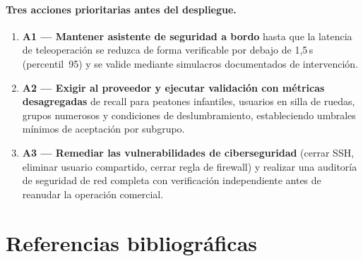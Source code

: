 \documentclass[11pt]{article}
\begin{document}
\paragraph{Tres acciones prioritarias antes del despliegue.}
\begin{enumerate}[nosep]
    \item \textbf{A1 --- Mantener asistente de seguridad a bordo} hasta que la latencia de teleoperación se reduzca de forma verificable por debajo de 1,5\,s (percentil~95) y se valide mediante simulacros documentados de intervención.
    \item \textbf{A2 --- Exigir al proveedor y ejecutar validación con métricas desagregadas} de recall para peatones infantiles, usuarios en silla de ruedas, grupos numerosos y condiciones de deslumbramiento, estableciendo umbrales mínimos de aceptación por subgrupo.
    \item \textbf{A3 --- Remediar las vulnerabilidades de ciberseguridad} (cerrar SSH, eliminar usuario compartido, cerrar regla de firewall) y realizar una auditoría de seguridad de red completa con verificación independiente antes de reanudar la operación comercial.
\end{enumerate}



\section{Referencias bibliográficas}
\printbibliography[heading=none]
\end{document}
